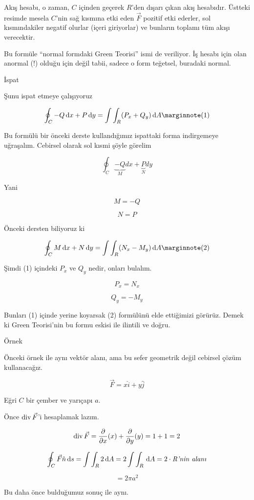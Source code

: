 \documentclass[12pt,fleqn]{article}\usepackage{../../common}
\begin{document}
Akış hesabı, o zaman, $C$ içinden geçerek $R$'den dışarı çıkan akış
hesabıdır. Üstteki resimde mesela $C$'nin sağ kısmına etki eden $\vec{F}$
pozitif etki ederler, sol kısmındakiler negatif olurlar (içeri giriyorlar)
ve bunların toplamı tüm akışı verecektir. 

Bu formüle ``normal formdaki Green Teorisi'' ismi de veriliyor. İş hesabı
için olan anormal (!) olduğu için değil tabii, sadece o form teğetsel,
buradaki normal. 

İspat

Şunu ispat etmeye çalışıyoruz

$$
\oint_C -Q \ud x + P \ud y = \int \int_R (P_x + Q_y) \ud A 
\mlabel{1}
$$

Bu formülü bir önceki derste kullandığımız ispattaki forma indirgemeye
uğraşalım. Cebirsel olarak sol kısmi şöyle görelim

$$ \oint_C 
\underbrace{-Q}_{M}dx + 
\underbrace{P}_{N}dy 
$$

Yani 

$$ M = -Q $$

$$ N = P $$

Önceki dersten biliyoruz ki 

$$
\oint_C M \ud x + N \ud y = \int \int_R (N_x - M_y) \ud A 
\mlabel{2}
$$

Şimdi (1) içindeki $P_x$ ve $Q_y$ nedir, onları bulalım. 

$$ P_x = N_x $$

$$ Q_y = -M_y $$

Bunları (1) içinde yerine koyarsak (2) formülünü elde ettiğimizi görürüz. Demek
ki Green Teorisi'nin bu formu eskisi ile ilintili ve doğru.

Örnek

Önceki örnek ile aynı vektör alanı, ama bu sefer geometrik değil cebirsel
çözüm kullanacağız. 

$$ \vec{F} = x\hat{i} + y\hat{j} $$

Eğri $C$ bir çember ve yarıçapı $a$. 

Önce $\operatorname{div} \vec{F}$'i hesaplamak lazım. 

$$ \operatorname{div} \vec{F}  = 
\frac{\partial }{\partial x}(x) + 
\frac{\partial }{\partial y}(y) = 
1 + 1 = 2 
 $$

$$
\oint_C \vec{F} \hat{n} \,\mathrm{d} s = 
\int \int_R 2 \,\mathrm{d} A = 2 \int \int_R \,\mathrm{d} A = 
2 \cdot \textit{R'nin alanı}
$$

$$ = 2\pi a^2 $$

Bu daha önce bulduğumuz sonuç ile aynı.
\end{document}
